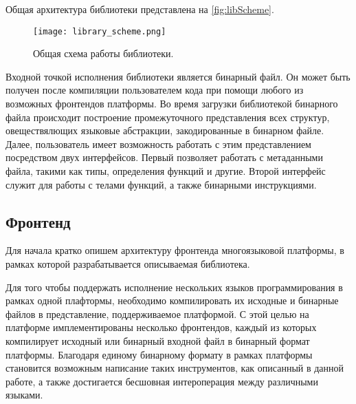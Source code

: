 Общая архитектура библиотеки представлена на \autoref{fig:libScheme}.

\begin{figure}[h]
\centering
\texttt{[image: library\_scheme.png]}
\caption{Общая схема работы библиотеки.}
\label{fig:libScheme}
\end{figure}

Входной точкой исполнения библиотеки является бинарный файл. Он может быть получен после компиляции пользователем кода при помощи любого из возможных фронтендов платформы. Во время загрузки библиотекой бинарного файла происходит построение промежуточного представления всех структур, овеществялющих языковые абстракции, закодированные в бинарном файле. Далее, пользователь имеет возможность работать с этим представлением посредством двух интерфейсов. Первый позволяет работать с метаданными файла, такими как типы, определения функций и другие. Второй интерфейс служит для работы с телами функций, а также бинарными инструкциями.

\subsection{Фронтенд}

Для начала кратко опишем архитектуру фронтенда многоязыковой платформы, в рамках которой разрабатывается описываемая библиотека.

Для того чтобы поддержать исполнение нескольких языков программирования в рамках одной плафтормы, необходимо компилировать их исходные и бинарные файлов в представление, поддерживаемое платформой. С этой целью на платформе имплементированы несколько фронтендов, каждый из которых компилирует исходный или бинарный входной файл в бинарный формат платформы. Благодаря единому бинарному формату в рамках платформы становится возможным написание таких инструментов, как описанный в данной работе, а также достигается бесшовная интероперация между различными языками.


